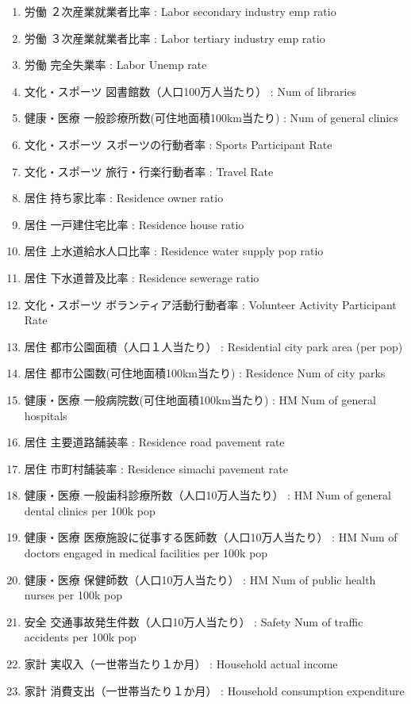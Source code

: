 \begin{multicols}{2}
\begin{enumerate}
  \item 労働 ２次産業就業者比率  :  Labor secondary industry emp ratio
  \item 労働 ３次産業就業者比率  :  Labor tertiary industry emp ratio
  \item 労働 完全失業率  :  Labor Unemp rate
  \item 文化・スポーツ 図書館数（人口100万人当たり）  :  Num of libraries
  \item 健康・医療 一般診療所数(可住地面積100km当たり)  :  Num of general clinics
  \item 文化・スポーツ スポーツの行動者率  :  Sports Participant Rate
  \item 文化・スポーツ 旅行・行楽行動者率  :  Travel Rate
  \item 居住 持ち家比率  :  Residence owner ratio
  \item 居住 一戸建住宅比率  :  Residence house ratio
  \item 居住 上水道給水人口比率  :  Residence water supply pop ratio
  \item 居住 下水道普及比率  :  Residence sewerage ratio
  \item 文化・スポーツ ボランティア活動行動者率  :  Volunteer Activity Participant Rate
  \item 居住 都市公園面積（人口１人当たり）  :  Residential city park area (per pop)
  \item 居住 都市公園数(可住地面積100km当たり)  :  Residence Num of city parks
  \item 健康・医療 一般病院数(可住地面積100km当たり)  :  HM Num of general hospitals
  \item 居住 主要道路舗装率  :  Residence road pavement rate
  \item 居住 市町村舗装率  :  Residence simachi pavement rate
  \item 健康・医療 一般歯科診療所数（人口10万人当たり）  :  HM Num of general dental clinics per 100k pop
  \item 健康・医療 医療施設に従事する医師数（人口10万人当たり）  :  HM Num of doctors engaged in medical facilities per 100k pop
  \item 健康・医療 保健師数（人口10万人当たり）  :  HM Num of public health nurses per 100k pop
  \item 安全 交通事故発生件数（人口10万人当たり）  :  Safety Num of traffic accidents per 100k pop
  \item 家計 実収入（一世帯当たり１か月）  :  Household actual income
  \item 家計 消費支出（一世帯当たり１か月）  :  Household consumption expenditure

\end{enumerate}
\end{multicols}
